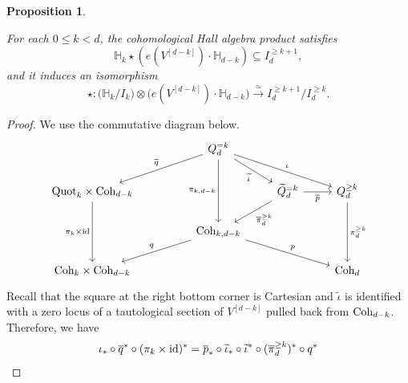 \documentclass[10pt]{amsart}
\newcommand{\BH}{\mathbb{H}}
\newcommand{\Quot}{\textnormal{Quot}}
\newcommand{\Coh}{\textnormal{Coh}}
\newcommand{\id}{\textnormal{id}}
\newcommand{\+}{{}^+}
\newtheorem {proposition}[theorem]{Proposition}
\theoremstyle{definition}
\theoremstyle {definition}
\theoremstyle {definition}
\begin{document}
\begin{proposition}\label{prop: main proposition for basis}

For each $0\leq k<d$, the cohomological Hall algebra product satisfies
$$\BH_k\star(e(V^{[d-k]})\cdot \BH_{d-k})\subseteq I^{\geq k+1}_d,$$
and it induces an isomorphism 
$$\star: \Big(\BH_k/I_k\Big)\otimes \Big(e(V^{[d-k]})\cdot \BH_{d-k}\Big)\overset{\simeq}{\longrightarrow} I^{\geq k+1}_d/I^{\geq k}_d. 
$$
\end{proposition}
\begin{proof}
We use the commutative diagram below.  
\begin{equation*}
\begin{tikzcd}
                                                        &  & Q^{=k}_d \arrow[rd, "\widetilde \iota"'] \arrow[rrd, "\iota"] \arrow[dd, "{\pi_{k, d-k}}"'] \arrow[lld, "\overline{q}"'] &                                                                                        &                                           \\
\Quot_k\times \Coh_{d-k} \arrow[dd, "\pi_k\times \id"'] &  &                                                                                                                          & \widetilde Q^{=k}_d \arrow[r, "\overline{p}"'] \arrow[ld, "\overline{\pi}_d^{\geq k}"] & Q^{\geq k}_d \arrow[dd, "\pi_d^{\geq k}"] \\
                                                        &  & {\Coh_{k, d-k}} \arrow[rrd, "p"] \arrow[lld, "q"']                                                                       &                                                                                        &                                           \\
\Coh_k\times \Coh_{d-k}                                 &  &                                                                                                                          &                                                                                        & \Coh_d                                   
\end{tikzcd}
\end{equation*}
Recall that the square at the right bottom corner is Cartesian and $\widetilde{\iota}$ is identified with a zero locus of a tautological section of $V^{[d-k]}$ pulled back from $\Coh_{d-k}$. Therefore, we have
\begin{align*}
    \iota_*\circ \overline{q}^*\circ (\pi_k\times \id)^*
    &=\overline{p}_*\circ \widetilde{\iota}_*\circ \widetilde{\iota}^*\circ (\overline{\pi}^{\geq k}_d)^*\circ q^*\\

\end{align*}
\end{proof}
\end{document}
